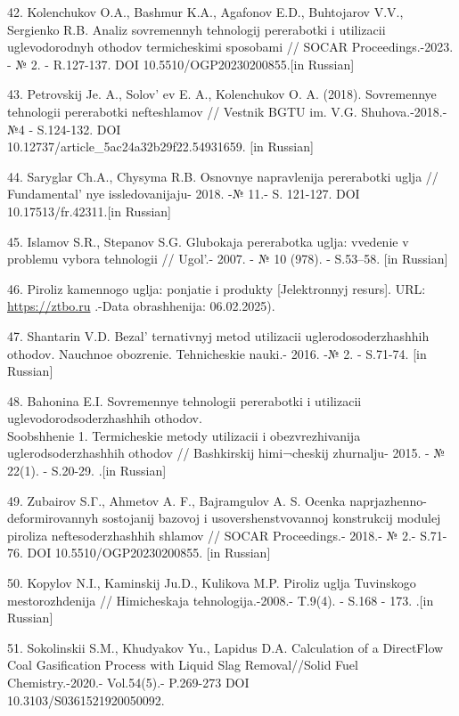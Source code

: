 \begin{references}
42. Kolenchukov O.A., Bashmur K.A., Agafonov E.D., Buhtojarov V.V.,
Sergienko R.B. Analiz sovremen\-nyh tehnologij pererabotki i utilizacii
uglevodorodnyh othodov termicheskimi sposobami // SOCAR
Proc\-eedings.-2023. - № 2. - R.127-137. DOI 10.5510/OGP20230200855.{[}in
Russian{]}

43. Petrovskij Je. A., Solov' ev E. A., Kolenchukov O. A.
(2018). Sovremennye tehnologii pererabotki nefteshlamov // Vestnik BGTU
im. V.G. Shuhova.-2018.- №4 - S.124-132. DOI \\
10.12737/article\_5ac24a32b29f22.54931659. {[}in Russian{]}

44. Saryglar Ch.A., Chysyma R.B. Osnovnye napravlenija pererabotki uglja
// Fundamental' nye issled\-ovanijaju- 2018. -№ 11.- S.
121-127. DOI 10.17513/fr.42311.{[}in Russian{]}

45. Islamov S.R., Stepanov S.G. Glubokaja pererabotka uglja: vvedenie v
problemu vybora tehnologii // Ugol'.- 2007. - № 10 (978).
- S.53--58. {[}in Russian{]}

46. Piroliz kamennogo uglja: ponjatie i produkty {[}Jelektronnyj
resurs{]}. URL:
\href{https://ztbo.ru/o-tbo/stati/piroliz/piroliz-kamennogo-uglya-ponyatie-i-produkti}{https://ztbo.ru} .-Data
obrash\-henija: 06.02.2025).

47. Shantarin V.D. Bezal' ternativnyj metod utilizacii
uglerodosoderzhashhih othodov. Nauchnoe obozrenie. Tehnicheskie nauki.-
2016. -№ 2. - S.71-74. {[}in Russian{]}

48. Bahonina E.I. Sovremennye tehnologii pererabotki i utilizacii
uglevodorodsoderzhashhih othodov. \\Soobshhenie 1. Termicheskie metody
utilizacii i obezvrezhivanija uglerodsoderzhashhih othodov //
Bashk\-irskij himi¬cheskij zhurnalju- 2015. - № 22(1). - S.20-29. .{[}in
Russian{]}

49. Zubairov S.Γ., Ahmetov A. F., Bajramgulov A. S. Ocenka
naprjazhenno-deformirovannyh sostojanij bazovoj i usovershenstvovannoj
konstrukcij modulej piroliza neftesoderzhashhih shlamov // SOCAR
Proc\-eedings.- 2018.- № 2.- S.71-76. DOI 10.5510/OGP20230200855.
{[}in Russian{]}

50. Kopylov N.I., Kaminskij Ju.D., Kulikova M.P. Piroliz uglja
Tuvinskogo mestorozhdenija // Himiches\-kaja tehnologija.-2008.- T.9(4).
- S.168 - 173. .{[}in Russian{]}

51. Sokolinskii S.M., Khudyakov Yu., Lapidus D.A. Calculation of a
DirectFlow Coal Gasification Process with Liquid Slag Removal//Solid
Fuel Chemistry.-2020.- Vol.54(5).- P.269-273 DOI\\
10.3103/S0361521920050092.


\end{references}
